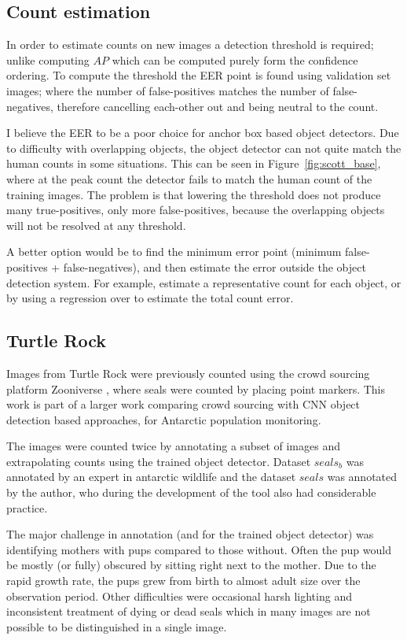 \subsection {Count estimation}

In order to estimate counts on new images a detection threshold is required;  unlike computing $AP$ which can be computed purely form the confidence ordering. To  compute the threshold the \gls{EER} point is found using validation set images; where the number of false-positives matches the number of false-negatives, therefore cancelling each-other out and being neutral to the count.

I believe the \gls{EER} to be a poor choice for anchor box based object detectors. Due to difficulty with overlapping objects, the object detector can not quite match the human counts in some situations. This can be seen in Figure~\ref{fig:scott_base}, where at the peak count the detector fails to match the human count of the training images. The problem is that lowering the threshold does not produce many true-positives, only more false-positives, because the overlapping objects will not be resolved at any threshold.

A better option would be to find the minimum error point (minimum false-positives + false-negatives), and then estimate the error outside the object detection system. For example, estimate a representative count for each object, or by using a regression over to estimate the total count error.

\subsection{Turtle Rock \texorpdfstring{\cite{Eisert2015}}{}}
 
 Images from Turtle Rock were previously counted using the crowd sourcing platform Zooniverse \cite{Zooniverse}, where seals were counted by placing point markers. This work is part of a larger work comparing crowd sourcing with \gls{CNN} object detection based approaches, for Antarctic population monitoring. 
 
 The images were counted twice by annotating a subset of images and extrapolating counts using the trained object detector. Dataset $seals_b$ was annotated by an expert in antarctic wildlife and the dataset $seals$ was annotated by the author, who during the development of the tool also had considerable practice. 
 
 The major challenge in annotation (and for the trained object detector) was identifying mothers with pups compared to those without. Often the pup would be mostly (or fully) obscured by sitting right next to the mother.  Due to the rapid growth rate, the pups grew from birth to almost adult size over the observation period. Other difficulties were occasional harsh lighting and inconsistent treatment of dying or dead seals which in many images are not possible to be distinguished in a single image.
 
